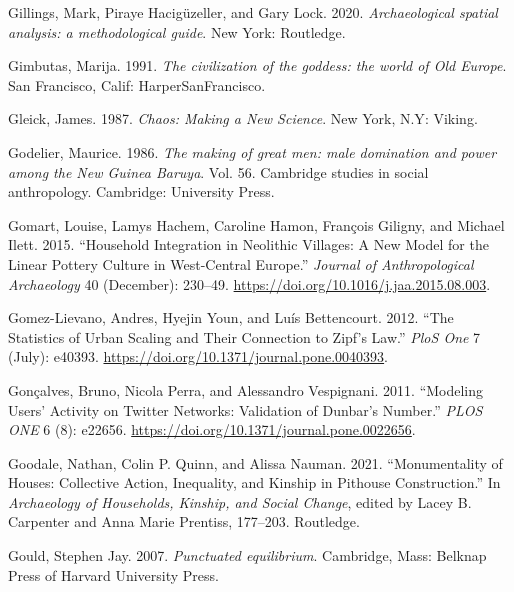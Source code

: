 \documentclass[
  12pt,
  a4paper, twoside]{book}
\newlength{\cslhangindent}
\newlength{\cslentryspacingunit} %
\newenvironment{CSLReferences}[2] %
 {%
  \setlength{\parindent}{0pt}
  \ifodd #1
  \let\oldpar\par
  \def\par{\hangindent=\cslhangindent\oldpar}
  \fi
  \setlength{\parskip}{#2\cslentryspacingunit}
 }%
 {}
\begin{document}
\begin{CSLReferences}{1}{0}
\leavevmode{}%
Gillings, Mark, Piraye Hacigüzeller, and Gary Lock. 2020. \emph{Archaeological spatial analysis: a methodological guide}. New York: Routledge.

\leavevmode{}%
Gimbutas, Marija. 1991. \emph{The civilization of the goddess: the world of Old Europe}. San Francisco, Calif: HarperSanFrancisco.

\leavevmode{}%
Gleick, James. 1987. \emph{Chaos: Making a New Science}. {New York, N.Y}: {Viking}.

\leavevmode{}%
Godelier, Maurice. 1986. \emph{The making of great men: male domination and power among the New Guinea Baruya}. Vol. 56. Cambridge studies in social anthropology. Cambridge: University Press.

\leavevmode{}%
Gomart, Louise, Lamys Hachem, Caroline Hamon, François Giligny, and Michael Ilett. 2015. {``Household Integration in Neolithic Villages: A New Model for the Linear Pottery Culture in West-Central Europe.''} \emph{Journal of Anthropological Archaeology} 40 (December): 230--49. \url{https://doi.org/10.1016/j.jaa.2015.08.003}.

\leavevmode{}%
Gomez-Lievano, Andres, Hyejin Youn, and Luís Bettencourt. 2012. {``The Statistics of Urban Scaling and Their Connection to Zipf{'}s Law.''} \emph{PloS One} 7 (July): e40393. \url{https://doi.org/10.1371/journal.pone.0040393}.

\leavevmode{}%
Gonçalves, Bruno, Nicola Perra, and Alessandro Vespignani. 2011. {``Modeling Users' Activity on Twitter Networks: Validation of Dunbar's Number.''} \emph{PLOS ONE} 6 (8): e22656. \url{https://doi.org/10.1371/journal.pone.0022656}.

\leavevmode{}%
Goodale, Nathan, Colin P. Quinn, and Alissa Nauman. 2021. {``Monumentality of Houses: {Collective} Action, Inequality, and Kinship in Pithouse Construction.''} In \emph{Archaeology of {Households}, {Kinship}, and {Social Change}}, edited by Lacey B. Carpenter and Anna Marie Prentiss, 177--203. {Routledge}.

\leavevmode{}%
Gould, Stephen Jay. 2007. \emph{Punctuated equilibrium}. Cambridge, Mass: Belknap Press of Harvard University Press.


\end{CSLReferences}
\end{document}
